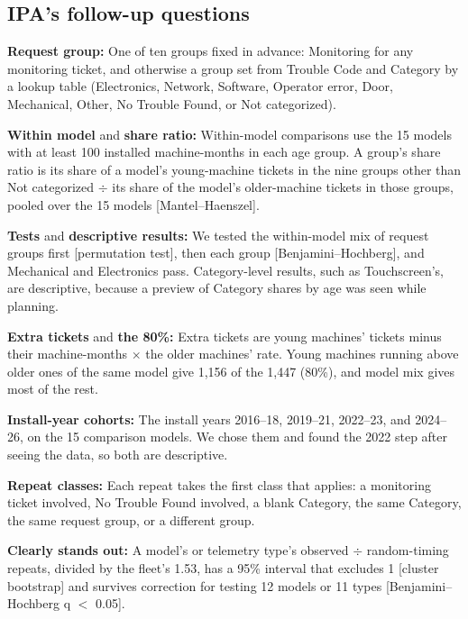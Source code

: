 \subsection*{IPA's follow-up questions}
\begin{ipadefs}
\item \textbf{Request group:} One of ten groups fixed in advance: Monitoring for any monitoring ticket, and otherwise a group set from Trouble Code and Category by a lookup table (Electronics, Network, Software, Operator error, Door, Mechanical, Other, No Trouble Found, or Not categorized).
\item \textbf{Within model} and \textbf{share ratio:} Within-model comparisons use the 15 models with at least 100 installed machine-months in each age group. A group's share ratio is its share of a model's young-machine tickets in the nine groups other than Not categorized $\div$ its share of the model's older-machine tickets in those groups, pooled over the 15 models [Mantel--Haenszel].
\item \textbf{Tests} and \textbf{descriptive results:} We tested the within-model mix of request groups first [permutation test], then each group [Benjamini--Hochberg], and Mechanical and Electronics pass. Category-level results, such as Touchscreen's, are descriptive, because a preview of Category shares by age was seen while planning.
\item \textbf{Extra tickets} and \textbf{the 80\%:} Extra tickets are young machines' tickets minus their machine-months $\times$ the older machines' rate. Young machines running above older ones of the same model give 1,156 of the 1,447 (80\%), and model mix gives most of the rest.
\item \textbf{Install-year cohorts:} The install years 2016--18, 2019--21, 2022--23, and 2024--26, on the 15 comparison models. We chose them and found the 2022 step after seeing the data, so both are descriptive.
\item \textbf{Repeat classes:} Each repeat takes the first class that applies: a monitoring ticket involved, No Trouble Found involved, a blank Category, the same Category, the same request group, or a different group.
\item \textbf{Clearly stands out:} A model's or telemetry type's observed $\div$ random-timing repeats, divided by the fleet's 1.53, has a 95\% interval that excludes 1 [cluster bootstrap] and survives correction for testing 12 models or 11 types [Benjamini--Hochberg q $<$ 0.05].
\end{ipadefs}
